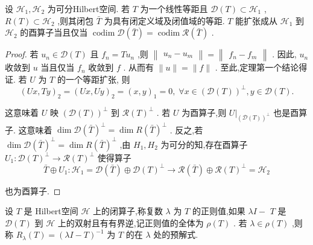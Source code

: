 \documentclass[lang=cn,newtx,10pt,scheme=chinese,thmcnt=chapter]{elegantbook}
\begin{document}
\begin{theorem}
    设 \({\mathcal{H}}_{1},{\mathcal{H}}_{2}\) 为可分Hilbert空间. 若 \(T\) 为一个线性等距且 \(\mathcal{D}(T)  \subset  {\mathcal{H}}_{1}\) , \(R\left( T\right)  \subset  {\mathcal{H}}_{2}\) ,则其闭包 \(\bar{T}\) 为具有闭定义域及闭值域的等距. \(T\) 能扩张成从 \({\mathcal{H}}_{1}\) 到 \({\mathcal{H}}_{2}\) 的酉算子当且仅当 \(\operatorname{codim} \mathcal{D}\left( \bar{T}\right)  = \operatorname{codim} \mathcal{R}\left( \bar{T}\right)\) .
\end{theorem}
\begin{proof}
    若 \({u}_{n} \in  \mathcal{D}(T)\) 且 \({f}_{n} = T{u}_{n}\) ,则 \(\begin{Vmatrix}{{u}_{n} - {u}_{m}}\end{Vmatrix} = \begin{Vmatrix}{{f}_{n} - {f}_{m}}\end{Vmatrix}\) . 因此, \({u}_{n}\) 收敛到 \(u\) 当且仅当 \({f}_{n}\) 收敛到 \(f\) . 从而有 \(\parallel u\parallel  = \parallel f\parallel\) . 至此,定理第一个结论得证. 若 \(U\) 为 \(T\) 的一个等距扩张, 则
\begin{equation*}
{\left( Ux,Ty\right) }_{2} = {\left( Ux,Uy\right) }_{2} = {\left( x,y\right) }_{1} = 0,\;\forall x \in  {\left( \mathcal{D}(T) \right) }^{ \bot  },y \in  \mathcal{D}(T) .
\end{equation*}

这意味着 \(U\) 映 \({\left( \mathcal{D}(T) \right) }^{ \bot  }\) 到 \(\mathcal{R}{\left( T\right) }^{ \bot  }\) . 若 \(U\) 为酉算子,则 \({\left. U\right| }_{{\left( \mathcal{D}(T) \right) }^{ \bot  }}\) 也是酉算子. 这意味着 \(\dim \mathcal{D}{\left( \bar{T}\right) }^{ \bot  } = \dim R{\left( \bar{T}\right) }^{ \bot  }\) . 反之,若 \(\dim \mathcal{D}{\left( \bar{T}\right) }^{ \bot  } = \dim R{\left( \bar{T}\right) }^{ \bot  }\) ,由 \({H}_{1},{H}_{2}\) 为可分的知,存在酉算子 \({U}_{1} : \mathcal{D}{\left( T\right) }^{ \bot  } \rightarrow  \mathcal{R}{\left( T\right) }^{ \bot  }\) 使得算子
\begin{equation*}
\bar{T} \oplus  {U}_{1} : {\mathcal{H}}_{1} =  \mathcal{D}\left( \bar{T}\right)  \oplus  \mathcal{D}{\left( T\right) }^{ \bot  } \rightarrow   \mathcal{R}\left( \bar{T}\right)  \oplus  \mathcal{R}{\left( T\right) }^{ \bot  } = {\mathcal{H}}_{2}
\end{equation*}

也为酉算子.
\end{proof}

\begin{definition}
    设 \(T\) 是 Hilbert空间 \(\mathcal{H}\) 上的闭算子,称复数 \(\lambda\) 为 \(T\) 的正则值,如果 \({\lambda I} -\)  \(T\) 是 \(\mathcal{D}(T)\) 到 \(\mathcal{H}\) 上的双射且有有界逆,记正则值的全体为 \(\rho \left( T\right)\) . 若 \(\lambda  \in  \rho \left( T\right)\) ,则称 \({R}_{\lambda }\left( T\right)  = {\left( \lambda I - T\right) }^{-1}\) 为 \(T\) 的在 \(\lambda\) 处的预解式.
\end{definition}
\end{document}
